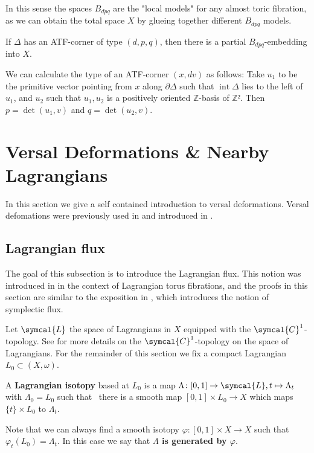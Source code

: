 \documentclass[12pt,a4paper,abstract=true,draft]{scrartcl}
\DeclareMathOperator{\interior}{int}
\begin{document}
In this sense the spaces $B_{dpq}$ are the "local models" for any almost toric fibration, as we can obtain the total space $X$ by glueing together different $B_{dpq}$ models.

\begin{lemma}
  \label{thm:atf_bdpq}
  If $Δ$ has an ATF-corner of type $(d,p,q)$, then there is a partial $B_{dpq}$-embedding into $X$.
\end{lemma}

\begin{remark}
  \label{rem:atf_corner_type_calc}
  We can calculate the type of an ATF-corner $(x,dv)$ as follows: Take $u_1$ to be the primitive vector pointing from $x$ along $∂Δ$ such that $\interior{Δ}$ lies to the left of $u_1$, and $u_2$ such that $u_1,u_2$ is a positively oriented $ℤ$-basis of $ℤ²$.
Then $p=\det(u_1,v)$ and $q = \det(u_2,v)$.
\end{remark}

\section{Versal Deformations \& Nearby Lagrangians}
\label{sec:vds}

In this section we give a self contained introduction to versal deformations.
Versal defomations were previously used in \cite{brendel2020real,brendel2023local,CheSch10} and introduced in \cite{Che96}.

\subsection{Lagrangian flux}
\label{sec:lagflux}

The goal of this subsection is to introduce the Lagrangian flux.
This notion was introduced in \cite[Section 2.4]{evans2021atfs} in the context of Lagrangian torus fibrations, and the proofs in this section are similar to the exposition in \cite[Section 10.2]{McDuffSalamonSympTop}, which introduces the notion of symplectic flux.

Let $\symcal{L}$ the space of Lagrangians in $X$ equipped with the $\symcal{C}^1$-topology.
See \cite{ono2008LagrangianFlux} for more details on the $\symcal{C}^1$-topology on the space of Lagrangians. 
For the remainder of this section we fix a compact Lagrangian $L_0 ⊂ (X,ω)$.

\begin{definition}
  A \textbf{Lagrangian isotopy} based at $L_0$ is a map $\Lambda \colon [0,1] \rightarrow \symcal{L}, t \mapsto \Lambda_t$ with $\Lambda_0 = L_0$ such that \ there is a smooth map $[0,1] \times L_0 \rightarrow X$ which maps $\{t\} \times L_0$ to $\Lambda_t$.

  Note that we can always find a smooth isotopy $φ \colon [0,1] × X → X$ such that\ $φ_t(L_0) = Λ_t$.
  In this case we say that \textbf{$Λ$ is generated by $φ$}.
\end{definition}
\end{document}
